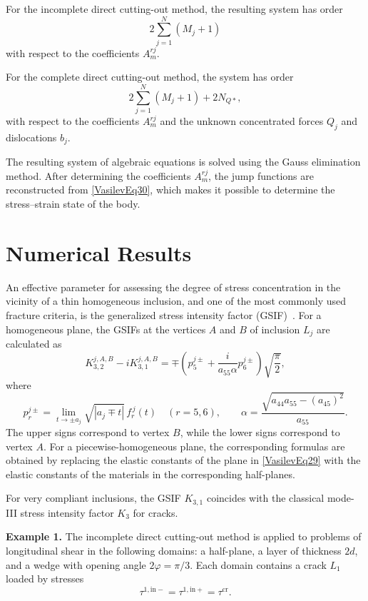 For the incomplete direct cutting-out method,
the resulting system has order
\[
2\sum_{j=1}^{N}(M_j+1)
\]
with respect to the coefficients $A_m^{rj}$.

For the complete direct cutting-out method,
the system has order
\[
2\sum_{j=1}^{N}(M_j+1)+2N_{Q*},
\]
with respect to the coefficients $A_m^{rj}$ and the unknown
concentrated forces $Q_j$ and dislocations $b_j$.

The resulting system of algebraic equations is solved using the
Gauss elimination method.
After determining the coefficients $A_m^{rj}$, the jump functions are
reconstructed from \eqref{VasilevEq30}, which makes it possible to
determine the stress–strain state of the body.

\section{Numerical Results}

An effective parameter for assessing the degree of stress concentration
in the vicinity of a thin homogeneous inclusion, and one of the most
commonly used fracture criteria, is the generalized stress intensity
factor (GSIF)~\cite{Vasilev25}. For a homogeneous plane, the GSIFs
at the vertices $A$ and $B$ of inclusion $L_j$ are calculated as
\begin{equation}
	\label{VasilevEq29}
K_{3,2}^{j,A,B}
-
iK_{3,1}^{j,A,B}
=
\mp
\left(
p_{5}^{j\pm}
+
\frac{i}{a_{55}\alpha}p_{6}^{j\pm}
\right)
\sqrt{\frac{\pi}{2}},
\end{equation}
%
where
\begin{equation*}
	p_r^{j\pm}
	=
	\lim_{t\to \pm a_j}
	\sqrt{|a_j\mp t|}
	\,f_r^{\,j}(t)
	\quad
	(r=5,6),
	\qquad
	\alpha
	=
	\frac{\sqrt{a_{44}a_{55}-(a_{45})^2}}{a_{55}}.
\end{equation*}
%
The upper signs correspond to vertex $B$, while the lower signs correspond
to vertex $A$.
For a piecewise-homogeneous plane, the corresponding formulas are obtained
by replacing the elastic constants of the plane in
\eqref{VasilevEq29} with the elastic constants of the materials
in the corresponding half-planes.

For very compliant inclusions, the GSIF $K_{3,1}$ coincides with the
classical mode-III stress intensity factor $K_3$ for cracks.

\medskip
\noindent\textbf{Example 1.}
The incomplete direct cutting-out method is applied to problems of
longitudinal shear in the following domains: a half-plane, a layer of
thickness $2d$, and a wedge with opening angle $2\varphi=\pi/3$.
Each domain contains a crack $L_1$ loaded by stresses
\[
\tau^{1,\mathrm{in}-}=\tau^{1,\mathrm{in}+}=\tau^{\mathrm{cr}}.
\]

